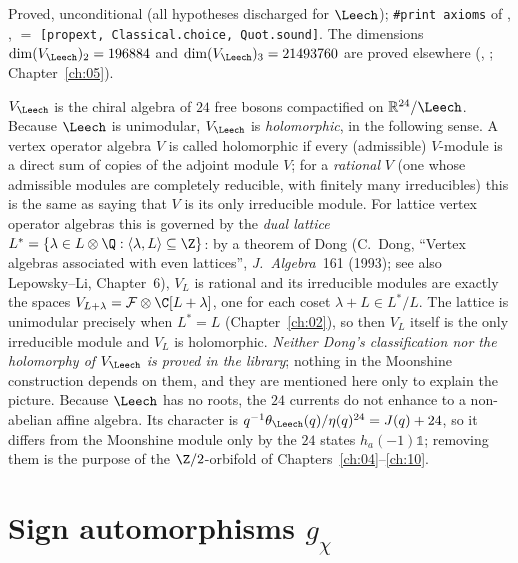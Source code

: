 \begin{status}
Proved, unconditional (all hypotheses discharged for $\Leech$);
\texttt{\#print axioms} of , ,
 $=$ \texttt{[propext, Classical.choice, Quot.sound]}. The dimensions
$\dim(V_\Leech)_2=196884$ and $\dim(V_\Leech)_3=21493760$ are proved elsewhere
(, ; Chapter~\ref{ch:05}).
\end{status}

\begin{remark}
$V_\Leech$ is the chiral algebra of $24$ free bosons compactified on $\chthreeR^{24}/\Leech$. Because
$\Leech$ is unimodular, $V_\Leech$ is \emph{holomorphic}, in the following sense. A vertex
operator algebra $V$ is called holomorphic if every (admissible) $V$-module is a direct sum of
copies of the adjoint module $V$; for a \emph{rational} $V$ (one whose admissible modules are
completely reducible, with finitely many irreducibles) this is the same as saying that $V$ is its
only irreducible module. For lattice vertex operator algebras this is governed by the
\emph{dual lattice} $L^*=\{\lambda\in L\otimes\Q:\langle\lambda,L\rangle\subseteq\Z\}$: by a theorem
of Dong (C.~Dong, ``Vertex algebras associated with even lattices'', \emph{J.\ Algebra}~161
(1993); see also Lepowsky--Li, Chapter~6), $V_L$ is rational and its irreducible modules are
exactly the spaces $V_{L+\lambda}=\mathcal F\otimes\C[L+\lambda]$, one for each coset
$\lambda+L\in L^*/L$. The lattice is unimodular precisely when $L^*=L$ (Chapter~\ref{ch:02}), so then
$V_L$ itself is the only irreducible module and $V_L$ is holomorphic. \emph{Neither Dong's
classification nor the holomorphy of $V_\Leech$ is proved in the library}; nothing in the
Moonshine construction depends on them, and they are mentioned here only to explain the picture.
Because $\Leech$ has no roots, the $24$ currents do not enhance to a non-abelian affine algebra. Its
character is $q^{-1}\theta_\Leech(q)/\eta(q)^{24}=J(q)+24$, so it differs from the Moonshine
module only by the $24$ states $h_a(-1)\mathbb 1$; removing them is the purpose of the
$\Z/2$-orbifold of Chapters~\ref{ch:04}--\ref{ch:10}.
\end{remark}

\section{Sign automorphisms \texorpdfstring{$g_\chi$}{g\_chi}}\label{ch03:sec:sign}

